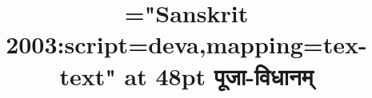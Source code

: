 \documentclass[a5paper,twoside,12pt]{book}
\begin{document}
\title{\font\x="Sanskrit 2003:script=deva,mapping=tex-text" at 48pt \x पूजा-विधानम्}
\date{}
\author{}
\maketitle

\newcommand{\ar}{\char"0930\char"094D\char"E009}
\newcommand{\ur}{\char"0930\char"094D\char"200C}
\newcommand{\sr}{\char"0930\char"094D\char"E007}
\newcommand{\sn}{\char"0928\char"094D\char"E007}
\newcommand{\snn}{\char"0928\char"094D\char"0928\char"094D\char"E007}
\newcommand{\an}{\char"0928\char"094D\char"E009}
\newcommand{\aav}{\char"093D\char"E009}
\newcommand{\sav}{\char"093D\char"E007}

\mbox{}\thispagestyle{empty}
\clearpage
\setcounter{page}{0}
\setlength{\emergencystretch}{3em}
\fontsize{16pt}{19.2pt}\selectfont

\end{document}
